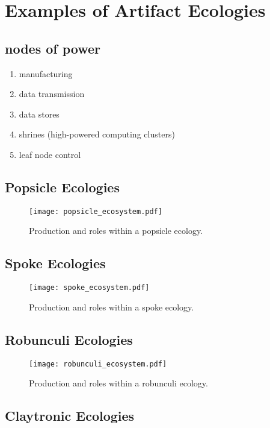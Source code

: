 \section{Examples of Artifact Ecologies}
\label{sec:artifact_ecologies}
%
\subsection{nodes of power}
        \begin{enumerate}
            \item manufacturing
            \item data transmission
            \item data stores
            \item shrines (high-powered computing clusters)
            \item leaf node control
        \end{enumerate}
        
\subsection{Popsicle Ecologies}
%
\begin{figure}[b!]
  \centering
    \texttt{[image: popsicle\_ecosystem.pdf]}
  \caption{Production and roles within a popsicle ecology.}
  \label{fig:popsicle_ecology}
\end{figure}
%

\subsection{Spoke Ecologies}
%
\begin{figure}[b!]
  \centering
    \texttt{[image: spoke\_ecosystem.pdf]}
  \caption{Production and roles within a spoke ecology.}
  \label{fig:spoke_ecology}
\end{figure}

%

\subsection{Robunculi Ecologies}
%
\begin{figure}[b!]
  \centering
    \texttt{[image: robunculi\_ecosystem.pdf]}
  \caption{Production and roles within a robunculi ecology.}
  \label{fig:robunculi_ecology}
\end{figure}
%

\subsection{Claytronic Ecologies}    
%


